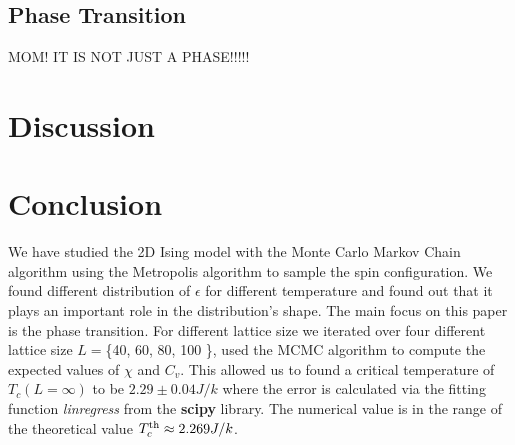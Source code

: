 \documentclass[english,notitlepage,reprint,nofootinbib]{revtex4-2}  %
\begin{document}
	\subsection{Phase Transition}\label{subsec:num phase transition}

	MOM! IT IS NOT JUST A PHASE!!!!!
	
	\section{Discussion}\label{sec:discussion}

	
	\section{Conclusion}\label{sec:conclusion}
	We have studied the 2D Ising model with the Monte Carlo Markov Chain algorithm 
	using the Metropolis algorithm to sample the spin configuration. We found different 
	distribution of $\epsilon$ for different temperature and found out that it plays 
	an important role in the distribution's shape. The main focus on this paper is the 
	phase transition. For different lattice size we iterated over four different lattice 
	size $L=$\{40, 60, 80, 100 \}, used the MCMC algorithm to compute the expected values 
	of $\chi$ and $C_v$. This allowed us to found a critical temperature of $T_c(L=\infty)$
	to be $ 2.29 \pm 0.04 J/k $ where the error is calculated via the fitting function 
	\textit{linregress} from the \textbf{scipy} library. The numerical value is in the range
	of the theoretical value $T_{c}^{\rm th} \approx 2.269 J/k$.
	
	
	\onecolumngrid
	
	
	
	
\end{document}

